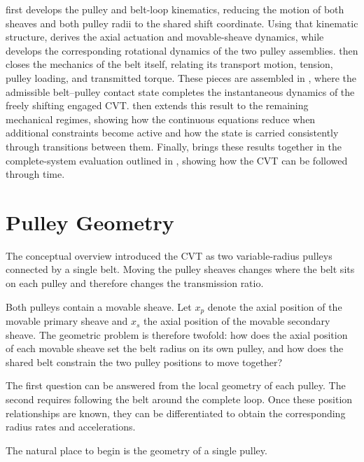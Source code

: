 \documentclass[11pt]{report}
\numberwithin{equation}{section}
\begin{document}
 first develops the pulley and belt-loop kinematics, reducing
the motion of both sheaves and both pulley radii to the shared shift coordinate.
Using that kinematic structure,  derives the
axial actuation and movable-sheave dynamics, while
 develops the corresponding rotational
dynamics of the two pulley assemblies.  then
closes the mechanics of the belt itself, relating its transport motion,
tension, pulley loading, and transmitted torque. These pieces are assembled in
, where the admissible belt--pulley contact
state completes the instantaneous dynamics of the freely shifting engaged CVT.
 then extends this result to the remaining
mechanical regimes, showing how the continuous equations reduce when additional
constraints become active and how the state is carried consistently through
transitions between them. Finally, 
brings these results together in the complete-system evaluation outlined in
, showing how the CVT can be followed through
time.

\section{Pulley Geometry}
\label{sec:geometry}

The conceptual overview introduced the CVT as two variable-radius pulleys
connected by a single belt. Moving the pulley sheaves changes where the belt
sits on each pulley and therefore changes the transmission ratio.

Both pulleys contain a movable sheave. Let \(x_p\) denote the axial position of
the movable primary sheave and \(x_s\) the axial position of the movable
secondary sheave. The geometric problem is therefore twofold: how does the
axial position of each movable sheave set the belt radius on its own pulley,
and how does the shared belt constrain the two pulley positions to move
together?

The first question can be answered from the local geometry of each pulley.
The second requires following the belt around the complete loop. Once these
position relationships are known, they can be differentiated to obtain the
corresponding radius rates and accelerations.

The natural place to begin is the geometry of a single pulley.
\end{document}
